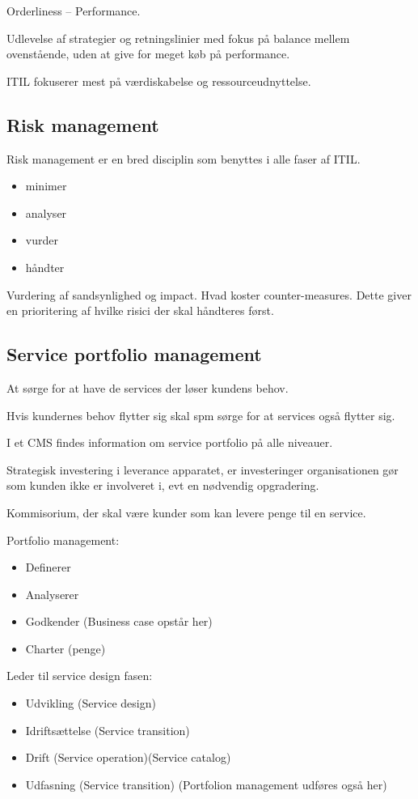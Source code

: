 Orderliness -- Performance.

Udlevelse af strategier og retningslinier med fokus på balance mellem ovenstående, uden at give for meget køb på performance.

ITIL fokuserer mest på værdiskabelse og ressourceudnyttelse.

\subsection{Risk management}
Risk management er en bred disciplin som benyttes i alle faser af ITIL.

\begin{itemize}
\item minimer
\item analyser
\item vurder
\item håndter
\end{itemize}

Vurdering af sandsynlighed og impact. Hvad koster counter-measures. Dette giver en prioritering af hvilke risici der skal håndteres først.

\subsection{Service portfolio management}
At sørge for at have de services der løser kundens behov.

Hvis kundernes behov flytter sig skal spm sørge for at services også flytter sig.

I et CMS findes information om service portfolio på alle niveauer.

Strategisk investering i leverance apparatet, er investeringer organisationen gør som kunden ikke er involveret i, evt en nødvendig opgradering.

Kommisorium, der skal være kunder som kan levere penge til en service.

Portfolio management:
\begin{itemize}
\item Definerer
\item Analyserer
\item Godkender (Business case opstår her)
\item Charter (penge)
\end{itemize}

Leder til service design fasen:
\begin{itemize}
\item Udvikling (Service design)
\item Idriftsættelse (Service transition)
\item Drift (Service operation)(Service catalog)
\item Udfasning (Service transition) (Portfolion management udføres også her)
\end{itemize}

